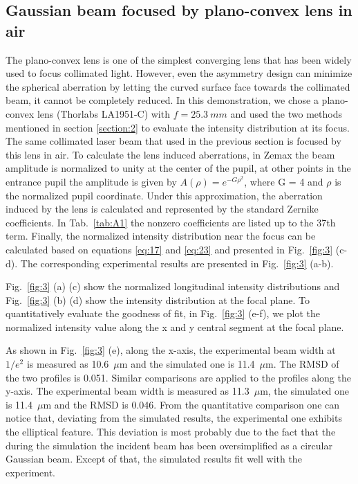 \documentclass[9pt,twocolumn,twoside]{osajnl}
\begin{document}
\subsection{Gaussian beam focused by plano-convex lens in air}
The plano-convex lens is one of the simplest converging lens that has been widely used to focus collimated light. However, even the asymmetry design can minimize the spherical aberration by letting the curved surface face towards the collimated beam, it cannot be completely reduced. In this demonstration, we chose a plano-convex lens (Thorlabs LA1951-C) with $f = 25.3~mm$ and used the two methods mentioned in section \ref{section:2} to evaluate the intensity distribution at its focus. The same collimated laser beam that used in the previous section is focused by this lens in air. To calculate the lens induced aberrations, in Zemax 
the beam amplitude is normalized to unity at the center of the pupil, at other points in the entrance pupil the amplitude is given by $A(\rho)=e^{-G\rho^2}$, where G = 4 and $\rho$ is the normalized pupil coordinate. Under this approximation, the aberration induced by the lens is calculated and represented by the standard Zernike coefficients. In Tab.~\ref{tab:A1} the nonzero coefficients are listed up to the 37th term. Finally, the normalized intensity distribution near the focus can be calculated based on equations \eqref{eq:17} and \eqref{eq:23} and presented in Fig.~\ref{fig:3} (c-d). The corresponding experimental results are presented in Fig.~\ref{fig:3} (a-b).

Fig.~\ref{fig:3} (a) (c) show the normalized longitudinal intensity distributions and Fig.~\ref{fig:3} (b) (d) show the intensity distribution at the focal plane. To quantitatively evaluate the goodness of fit, in Fig.~\ref{fig:3} (e-f), we plot the normalized intensity value along the x and y central segment at the focal plane.

As shown in Fig.~\ref{fig:3} (e), along the x-axis, the experimental beam width at $1/e^2$ is measured as 10.6~$\mu$m and the simulated one is 11.4~$\mu$m. The RMSD of the two profiles is 0.051. Similar comparisons are applied to the profiles along the y-axis. The experimental beam width is measured as 11.3~$\mu$m, the simulated one is 11.4~$\mu$m and the RMSD is 0.046. From the quantitative comparison one can notice that, deviating from the simulated results, the experimental one exhibits the elliptical feature. This deviation is most probably due to the fact that the during the simulation the incident beam has been oversimplified as a circular Gaussian beam. Except of that, the simulated results fit well with the experiment. 
\end{document}
